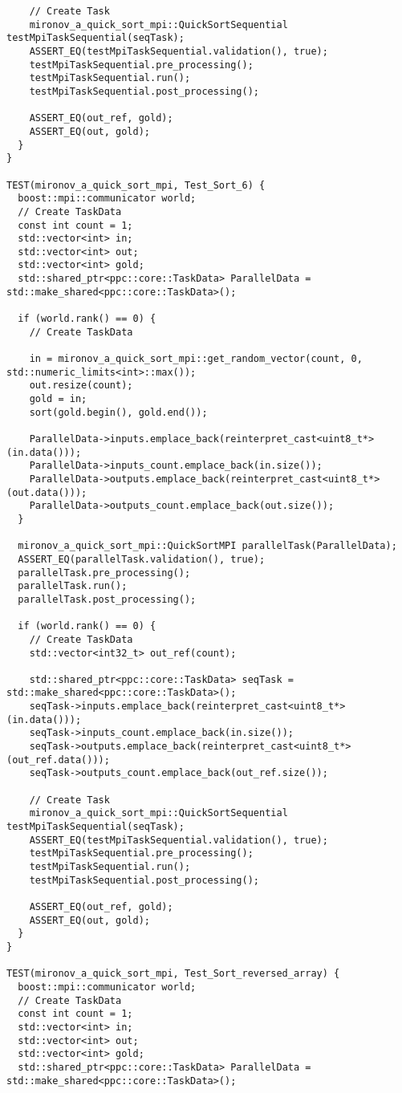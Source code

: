 \documentclass[12pt]{article}
\begin{document}
\begin{lstlisting}
    // Create Task
    mironov_a_quick_sort_mpi::QuickSortSequential testMpiTaskSequential(seqTask);
    ASSERT_EQ(testMpiTaskSequential.validation(), true);
    testMpiTaskSequential.pre_processing();
    testMpiTaskSequential.run();
    testMpiTaskSequential.post_processing();

    ASSERT_EQ(out_ref, gold);
    ASSERT_EQ(out, gold);
  }
}

TEST(mironov_a_quick_sort_mpi, Test_Sort_6) {
  boost::mpi::communicator world;
  // Create TaskData
  const int count = 1;
  std::vector<int> in;
  std::vector<int> out;
  std::vector<int> gold;
  std::shared_ptr<ppc::core::TaskData> ParallelData = std::make_shared<ppc::core::TaskData>();

  if (world.rank() == 0) {
    // Create TaskData

    in = mironov_a_quick_sort_mpi::get_random_vector(count, 0, std::numeric_limits<int>::max());
    out.resize(count);
    gold = in;
    sort(gold.begin(), gold.end());

    ParallelData->inputs.emplace_back(reinterpret_cast<uint8_t*>(in.data()));
    ParallelData->inputs_count.emplace_back(in.size());
    ParallelData->outputs.emplace_back(reinterpret_cast<uint8_t*>(out.data()));
    ParallelData->outputs_count.emplace_back(out.size());
  }

  mironov_a_quick_sort_mpi::QuickSortMPI parallelTask(ParallelData);
  ASSERT_EQ(parallelTask.validation(), true);
  parallelTask.pre_processing();
  parallelTask.run();
  parallelTask.post_processing();

  if (world.rank() == 0) {
    // Create TaskData
    std::vector<int32_t> out_ref(count);

    std::shared_ptr<ppc::core::TaskData> seqTask = std::make_shared<ppc::core::TaskData>();
    seqTask->inputs.emplace_back(reinterpret_cast<uint8_t*>(in.data()));
    seqTask->inputs_count.emplace_back(in.size());
    seqTask->outputs.emplace_back(reinterpret_cast<uint8_t*>(out_ref.data()));
    seqTask->outputs_count.emplace_back(out_ref.size());

    // Create Task
    mironov_a_quick_sort_mpi::QuickSortSequential testMpiTaskSequential(seqTask);
    ASSERT_EQ(testMpiTaskSequential.validation(), true);
    testMpiTaskSequential.pre_processing();
    testMpiTaskSequential.run();
    testMpiTaskSequential.post_processing();

    ASSERT_EQ(out_ref, gold);
    ASSERT_EQ(out, gold);
  }
}

TEST(mironov_a_quick_sort_mpi, Test_Sort_reversed_array) {
  boost::mpi::communicator world;
  // Create TaskData
  const int count = 1;
  std::vector<int> in;
  std::vector<int> out;
  std::vector<int> gold;
  std::shared_ptr<ppc::core::TaskData> ParallelData = std::make_shared<ppc::core::TaskData>();


\end{lstlisting}
\end{document}
